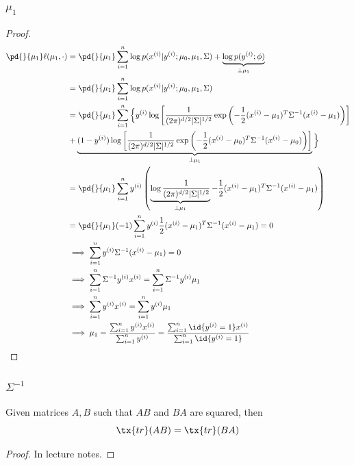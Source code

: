 \documentclass[11pt]{article}
\newcommand{\upi}[0]{^{(i)}}
\begin{document}
	\subsubsection{$\mu_1$}
	\begin{proof}
		\begin{align}
			\pd{}{\mu_1} \ell(\mu_1, \cdot) &= \pd{}{\mu_1} \sum_{i=1}^n
		\log p(x\upi|y\upi; \mu_0, \mu_1, \Sigma)
		+ \underbrace{\log p(y\upi; \phi)}_{\perp \mu_1} \\
		&= \pd{}{\mu_1} \sum_{i=1}^n \log p(x\upi|y\upi; \mu_0, \mu_1, \Sigma) \\
		&= \pd{}{\mu_1} \sum_{i=1}^n \Big\{
		y\upi \log \left [ \frac{1}{(2\pi)^{d/2}|\Sigma|^{1/2}} \exp \left (-\frac{1}{2} (x\upi - \mu_1)^T \Sigma^{-1} (x\upi - \mu_1) \right) \right ] \\
		&+\underbrace{ (1 - y\upi) \log \left [ \frac{1}{(2\pi)^{d/2}|\Sigma|^{1/2}} \exp \left (-\frac{1}{2} (x\upi - \mu_0)^T \Sigma^{-1} (x\upi - \mu_0) \right) \right ]}_{\perp \mu_1}
		\Big\} \\
		&= \pd{}{\mu_1} \sum_{i=1}^n y\upi \left (
		\underbrace{\log \frac{1}{(2\pi)^{d/2}|\Sigma|^{1/2}}}_{\perp \mu_1}
		-\frac{1}{2} (x\upi - \mu_1)^T \Sigma^{-1} (x\upi - \mu_1) \right) \\
		&= \pd{}{\mu_1} (-1) \sum_{i=1}^n y\upi \frac{1}{2} (x\upi - \mu_1)^T \Sigma^{-1} (x\upi - \mu_1) = 0 \\
		&\implies \sum_{i=1}^n y\upi \Sigma^{-1} (x\upi - \mu_1) = 0 \\
		&\implies \sum_{i=1}^n \Sigma^{-1} y\upi x\upi = \sum_{i=1}^n \Sigma^{-1} y\upi \mu_1 \\
		& \implies \sum_{i=1}^n y\upi x\upi = \sum_{i=1}^n y\upi \mu_1 \\
		& \implies \mu_1 = \frac{\sum_{i=1}^n y\upi x\upi}{\sum_{i=1}^n y\upi} = \frac{\sum_{i=1}^n \id{y\upi = 1} x\upi}{\sum_{i=1}^n \id{y\upi = 1}}
	\end{align}
	\end{proof}
	
	\subsubsection{$\Sigma^{-1}$}
	\begin{lemma}
		Given matrices $A, B$ such that $AB$ and $BA$ are squared, then
		\begin{equation}
			\tx{tr}(AB) = \tx{tr}(BA)
		\end{equation}
		\begin{proof}
			In lecture notes.
		\end{proof}
	\end{lemma}
	
\end{document}
